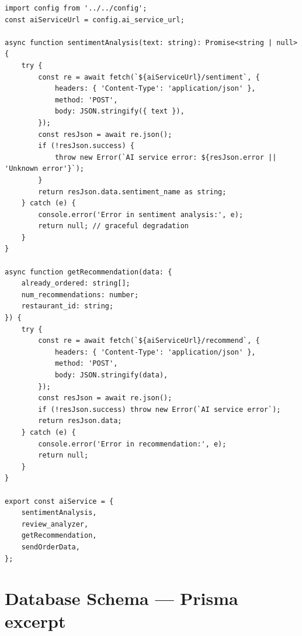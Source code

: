 \begin{lstlisting}[caption={AI microservice bridge --- resilient fetch with fallback --- \texttt{src/modules/aiService/index.ts}},label=lst:ai]
import config from '../../config';
const aiServiceUrl = config.ai_service_url;

async function sentimentAnalysis(text: string): Promise<string | null> {
    try {
        const re = await fetch(`${aiServiceUrl}/sentiment`, {
            headers: { 'Content-Type': 'application/json' },
            method: 'POST',
            body: JSON.stringify({ text }),
        });
        const resJson = await re.json();
        if (!resJson.success) {
            throw new Error(`AI service error: ${resJson.error || 'Unknown error'}`);
        }
        return resJson.data.sentiment_name as string;
    } catch (e) {
        console.error('Error in sentiment analysis:', e);
        return null; // graceful degradation
    }
}

async function getRecommendation(data: {
    already_ordered: string[];
    num_recommendations: number;
    restaurant_id: string;
}) {
    try {
        const re = await fetch(`${aiServiceUrl}/recommend`, {
            headers: { 'Content-Type': 'application/json' },
            method: 'POST',
            body: JSON.stringify(data),
        });
        const resJson = await re.json();
        if (!resJson.success) throw new Error(`AI service error`);
        return resJson.data;
    } catch (e) {
        console.error('Error in recommendation:', e);
        return null;
    }
}

export const aiService = {
    sentimentAnalysis,
    review_analyzer,
    getRecommendation,
    sendOrderData,
};
\end{lstlisting}

\section{Database Schema --- Prisma excerpt}
\label{app:schema}

